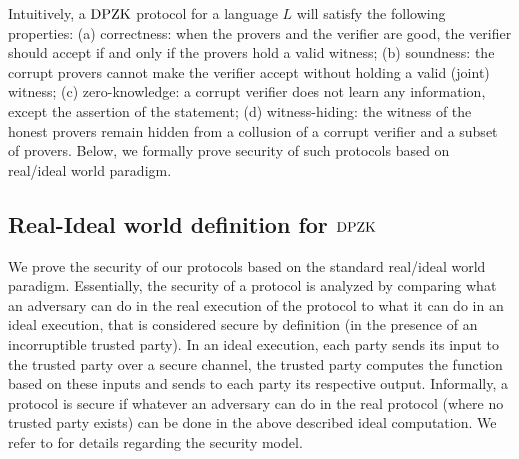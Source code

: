 Intuitively, a $\text{DPZK}$ protocol for a language $L$ will satisfy the following properties: (a)  correctness:  when the provers and the verifier are good, the verifier should accept if and only if the provers hold a valid witness; (b) soundness:  the corrupt provers cannot make the verifier accept without holding a valid (joint) witness; (c) zero-knowledge: a corrupt verifier does not learn any information, except  the assertion of the statement; (d)  witness-hiding: the witness of the honest provers remain hidden from a collusion of a corrupt verifier and a subset of provers. Below, we formally prove security of such protocols based on real/ideal world paradigm. 

\subsection{Real-Ideal world definition for $\text{DPZK}$}\label{subsec:real_ideal_def}
We prove the security of our protocols based on the standard real/ideal world paradigm.  Essentially, the security of a protocol is analyzed by comparing what an adversary can do in the real execution of the protocol to what it can do in an ideal execution,  that is considered secure by definition (in the presence of an incorruptible trusted party). In an ideal execution, each party sends its input to the trusted party over a secure channel, the trusted party computes the function based on these inputs and sends to each party its respective output.  Informally, a protocol
is secure if whatever an adversary can do in the real protocol (where no trusted party exists) can be done in the above described ideal computation. We refer to \cite{Canetti00,Goldreich2001,Lindell17,CohenL14} for details regarding the security model.  

